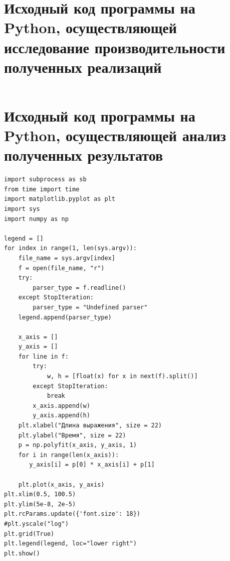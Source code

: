 \documentclass[bachelor, och, coursework]{SCWorks}
\begin{document}
\section{Исходный код программы на Python, осуществляющей исследование производительности полученных реализаций}\label{pril-2}

\inputminted[]{python}{test.py}

\section{Исходный код программы на Python, осуществляющей анализ полученных результатов}\label{pril-3}

\begin{verbatim}
import subprocess as sb
from time import time
import matplotlib.pyplot as plt
import sys
import numpy as np

legend = []
for index in range(1, len(sys.argv)):
    file_name = sys.argv[index]
    f = open(file_name, "r")
    try:
        parser_type = f.readline()
    except StopIteration:
        parser_type = "Undefined parser"
    legend.append(parser_type)
    
    x_axis = []
    y_axis = []
    for line in f:
        try:
            w, h = [float(x) for x in next(f).split()] 
        except StopIteration:
            break
        x_axis.append(w)
        y_axis.append(h)
    plt.xlabel("Длина выражения", size = 22)
    plt.ylabel("Время", size = 22)
    p = np.polyfit(x_axis, y_axis, 1)
    for i in range(len(x_axis)):
       y_axis[i] = p[0] * x_axis[i] + p[1]
    
    plt.plot(x_axis, y_axis)
plt.xlim(0.5, 100.5)
plt.ylim(5e-8, 2e-5)
plt.rcParams.update({'font.size': 18})
#plt.yscale("log")
plt.grid(True) 
plt.legend(legend, loc="lower right")
plt.show()
\end{verbatim}
\end{document}
